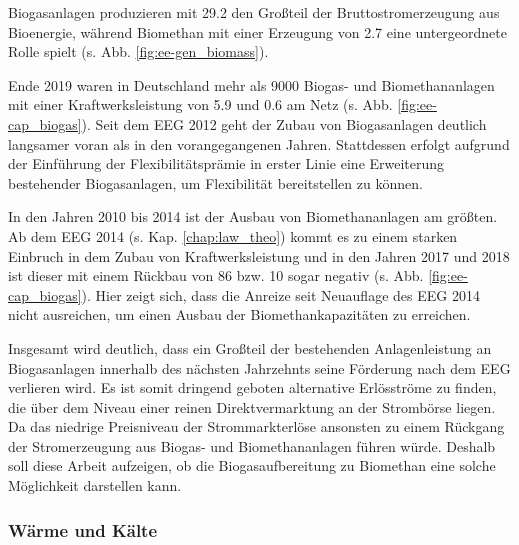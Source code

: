 

Biogasanlagen produzieren mit \SI{29.2}{\twh} den Großteil der Bruttostromerzeugung aus Bioenergie, während Biomethan mit einer Erzeugung von \SI{2.7}{\twh} eine untergeordnete Rolle spielt (s. Abb. \ref{fig:ee-gen_biomass}). \parencite{BWE2020} 



Ende 2019 waren in Deutschland mehr als \SI{9000}{\relax} Biogas- und Biomethananlagen mit einer Kraftwerksleistung von \SI{5.9}{\gw} und \SI{0.6}{\gw} am Netz (s. Abb. \ref{fig:ee-cap_biogas}). Seit dem \gls{EEG} \SI{2012}{\relax} geht der Zubau von Biogasanlagen deutlich langsamer voran als in den vorangegangenen Jahren. Stattdessen erfolgt aufgrund der Einführung der Flexibilitätsprämie in erster Linie eine Erweiterung bestehender Biogasanlagen, um Flexibilität bereitstellen zu können. \parencite{BWE2020} \parencite{DanielGromke2019}



In den Jahren 2010 bis \SI{2014}{\relax} ist der Ausbau von Biomethananlagen am größten. Ab dem \gls{EEG} \SI{2014}{\relax} (s. Kap. \ref{chap:law_theo}) kommt es zu einem starken Einbruch in dem Zubau von Kraftwerksleistung und in den Jahren \SI{2017}{\relax} und \SI{2018}{\relax} ist dieser mit einem Rückbau von \SI{86}{\mw} bzw. \SI{10}{\mw} sogar negativ (s. Abb. \ref{fig:ee-cap_biogas}). Hier zeigt sich, dass die Anreize seit Neuauflage des \gls{EEG} \SI{2014}{\relax} nicht ausreichen, um einen Ausbau der Biomethankapazitäten zu erreichen. \parencite{BWE2020} \smallskip

Insgesamt wird deutlich, dass ein Großteil der bestehenden Anlagenleistung an Biogasanlagen innerhalb des nächsten Jahrzehnts seine Förderung nach dem \gls{EEG} verlieren wird. Es ist somit dringend geboten alternative Erlösströme zu finden, die über dem Niveau einer reinen Direktvermarktung an der Strombörse liegen. Da das niedrige Preisniveau der Strommarkterlöse ansonsten zu einem Rückgang der Stromerzeugung aus Biogas- und Biomethananlagen führen würde. Deshalb soll diese Arbeit aufzeigen, ob die Biogasaufbereitung zu Biomethan eine solche Möglichkeit darstellen kann.



\subsubsection{Wärme und Kälte}

